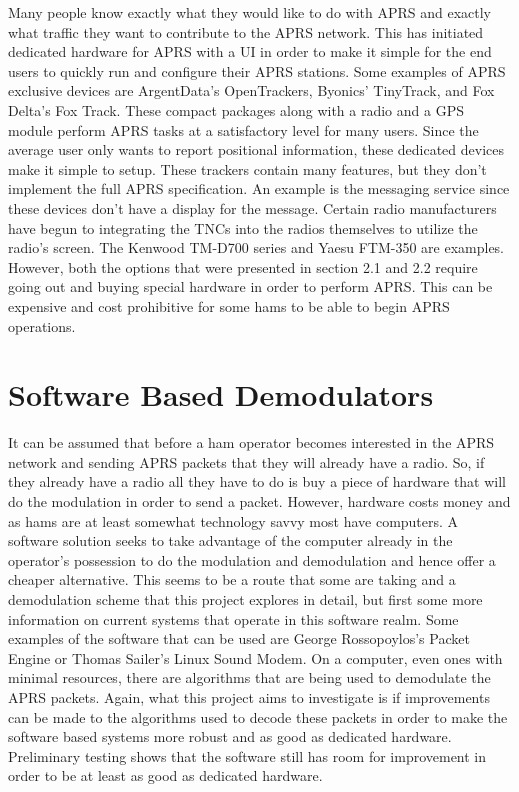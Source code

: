 Many people know exactly what they would like to do with APRS and exactly what traffic they want to contribute to the APRS network. This has initiated dedicated hardware for APRS with a UI in order to make it simple for the end users to quickly run and configure their APRS stations. Some examples of APRS exclusive devices are ArgentData’s OpenTrackers, Byonics’ TinyTrack, and Fox Delta’s Fox Track. These compact packages along with a radio and a GPS module perform APRS tasks at a satisfactory level for many users.
Since the average user only wants to report positional information, these dedicated devices make it simple to setup. These trackers contain many features, but they don’t implement the full APRS specification. An example is the messaging service since these devices don’t have a display for the message. Certain radio manufacturers have begun to integrating the TNCs into the radios themselves to utilize the radio’s screen. The Kenwood TM-D700 series and Yaesu FTM-350 are examples.
However, both the options that were presented in section 2.1 and 2.2 require going out and buying special hardware in order to perform APRS. This can be expensive and cost prohibitive for some hams to be able to begin APRS operations.

\section{Software Based Demodulators}

It can be assumed that before a ham operator becomes interested in the APRS network and sending APRS packets that they will already have a radio. So, if they already have a radio all they have to do is buy a piece of hardware that will do the modulation in order to send a packet. However, hardware costs money and as hams are at least somewhat technology savvy most have computers. A software solution seeks to take advantage of the computer already in the operator’s possession to do the modulation and demodulation and hence offer a cheaper alternative.
This seems to be a route that some are taking and a demodulation scheme that this project explores in detail, but first some more information on current systems that operate in this software realm. Some examples of the software that can be used are George Rossopoylos’s Packet Engine or Thomas Sailer’s Linux Sound Modem. On a computer, even ones with minimal resources, there are algorithms that are being used to demodulate the APRS packets. Again, what this project aims to investigate is if improvements can be made to the algorithms used to decode these packets in order to make the software based systems more robust and as good as dedicated hardware. Preliminary testing shows that the software still has room for improvement in order to be at least as good as dedicated hardware.
